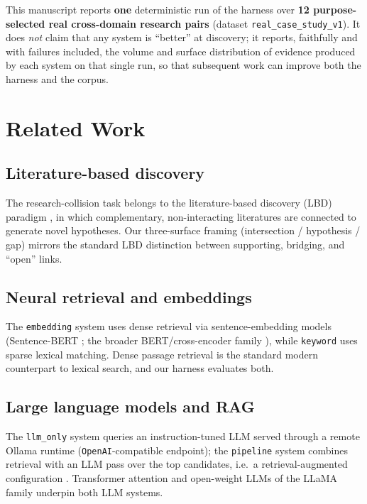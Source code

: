 \documentclass[11pt]{article}
\begin{document}
This manuscript reports \textbf{one} deterministic run of the harness over
\textbf{12 purpose-selected real cross-domain research pairs} (dataset
\texttt{real\_case\_study\_v1}). It does \emph{not} claim that any system is
``better'' at discovery; it reports, faithfully and with failures included, the
volume and surface distribution of evidence produced by each system on that
single run, so that subsequent work can improve both the harness and the corpus.

\section{Related Work}
\label{sec:rel}

\subsection{Literature-based discovery}
The research-collision task belongs to the literature-based discovery (LBD)
paradigm \citep{swanson1986, swanson1997}, in which complementary, non-interacting
literatures are connected to generate novel hypotheses. Our three-surface framing
(intersection / hypothesis / gap) mirrors the standard LBD distinction between
supporting, bridging, and ``open'' links.

\subsection{Neural retrieval and embeddings}
The \texttt{embedding} system uses dense retrieval via sentence-embedding models
(Sentence-BERT \citep{reimers2019sentencebert}; the broader BERT/cross-encoder
family \citep{devlin2019bert}), while \texttt{keyword} uses sparse lexical
matching. Dense passage retrieval \citep{karpukhin2020dpr} is the standard modern
counterpart to lexical search, and our harness evaluates both.

\subsection{Large language models and RAG}
The \texttt{llm\_only} system queries an instruction-tuned LLM served through a
remote Ollama runtime (\texttt{OpenAI}-compatible endpoint); the \texttt{pipeline}
system combines retrieval with an LLM pass over the top candidates, i.e.~a
retrieval-augmented configuration \citep{lewis2020rag}. Transformer attention
\citep{vaswani2017attention} and open-weight LLMs of the LLaMA family
\citep{touvron2023llama} underpin both LLM systems.
\end{document}
